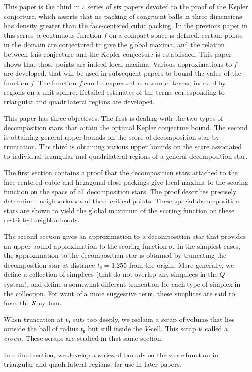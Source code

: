 
This paper is the third in a series of six papers devoted to the
proof of the Kepler conjecture, which asserts that no packing of
congruent balls in three dimensions has density greater than the
face-centered cubic packing.  In the previous paper in this series,
a continuous function $f$ on a compact space is defined, certain
points in the domain are conjectured to give the global maxima, and
the relation between this conjecture and the Kepler conjecture is
established. This paper shows that those points are indeed local
maxima. Various approximations to $f$ are developed, that will be
used in subsequent papers to bound the value of the function $f$.
The function $f$ can be expressed as a sum of terms, indexed by
regions on a unit sphere. Detailed estimates of the terms
corresponding to triangular and quadrilateral regions are developed.

This paper has three objectives. The first is dealing with the two
types of decomposition stars that attain the optimal Kepler
conjecture bound. The second is obtaining general upper bounds on
the score of decomposition star by truncation. The third is
obtaining various upper bounds on the score associated to individual
triangular and quadrilateral regions of a general decomposition
star.

The first section contains a proof that the decomposition stars
attached to the face-centered cubic and hexagonal-close packings
give local maxima to the scoring function on the space of all
decomposition stars.  The proof describes precisely determined
neighborhoods of these critical points.  These special decomposition
stars are shown to yield the global maximum of the scoring function
on these restricted neighborhoods.

The second section gives an approximation to a decomposition star
that provides an upper bound approximation to the scoring function
$\sigma$.  In the simplest cases, the approximation to the
decomposition star is obtained by truncating the decomposition star
at distance $t_0=1.255$  from the origin. More generally, we define
a collection of simplices (that do not overlap any simplices in the
$Q$-system), and define a somewhat different truncation for each
type of simplex in the collection. For want of a more suggestive
term, these simplices are said to form the ${\mathcal S}$-system.

When truncation at $t_0$ cuts too deeply, we reclaim a scrap of
volume that lies outside the ball of radius $t_0$ but still inside
the $V$-cell.  This scrap is called a {\it crown}. These scraps are
studied in that same section.

In a final section, we develop a series of bounds on the score
function in triangular and quadrilateral regions, for use in later
papers.
